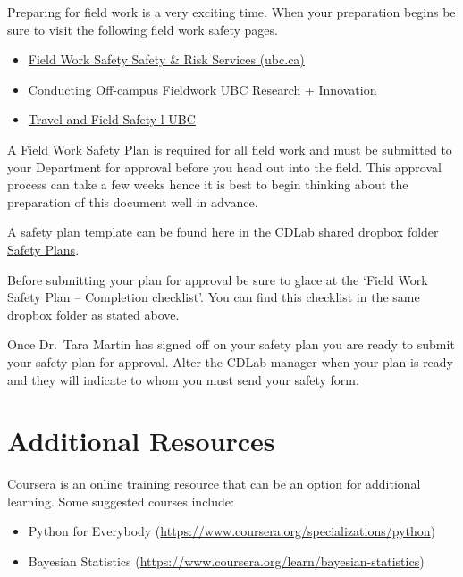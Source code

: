 \documentclass[
]{book}
\providecommand{\tightlist}{%
  \setlength{\itemsep}{0pt}\setlength{\parskip}{0pt}}
\begin{document}
Preparing for field work is a very exciting time. When your preparation begins be sure to visit the following field work safety pages.

\begin{itemize}
\tightlist
\item
  \href{https://srs.ubc.ca/health-safety/safety-programs/field-work-safety/}{Field Work Safety \textbar{} Safety \& Risk Services (ubc.ca)}
\item
  \href{https://research.ubc.ca/covid-19/conducting-off-campus-fieldwork}{Conducting Off-campus Fieldwork \textbar{} UBC Research + Innovation}
\item
  \href{https://travelfieldsafety.ubc.ca/about/}{Travel and Field Safety l UBC}
\end{itemize}

A Field Work Safety Plan is required for all field work and must be submitted to your Department for approval before you head out into the field. This approval process can take a few weeks hence it is best to begin thinking about the preparation of this document well in advance.

A safety plan template can be found here in the CDLab shared dropbox folder \href{https://www.dropbox.com/home/Conservation\%20Decisions\%20Lab/11_Health\%20and\%20Safety/01_Safety\%20plans}{Safety Plans}.

Before submitting your plan for approval be sure to glace at the `Field Work Safety Plan -- Completion checklist'. You can find this checklist in the same dropbox folder as stated above.

Once Dr.~Tara Martin has signed off on your safety plan you are ready to submit your safety plan for approval. Alter the CDLab manager when your plan is ready and they will indicate to whom you must send your safety form.

\hypertarget{additionalresources}{%
\chapter*{Additional Resources}\label{additionalresources}}

Coursera is an online training resource that can be an option for additional learning. Some suggested courses include:

\begin{itemize}
\tightlist
\item
  Python for Everybody (\url{https://www.coursera.org/specializations/python})
\item
  Bayesian Statistics (\url{https://www.coursera.org/learn/bayesian-statistics})
\end{itemize}
\end{document}
